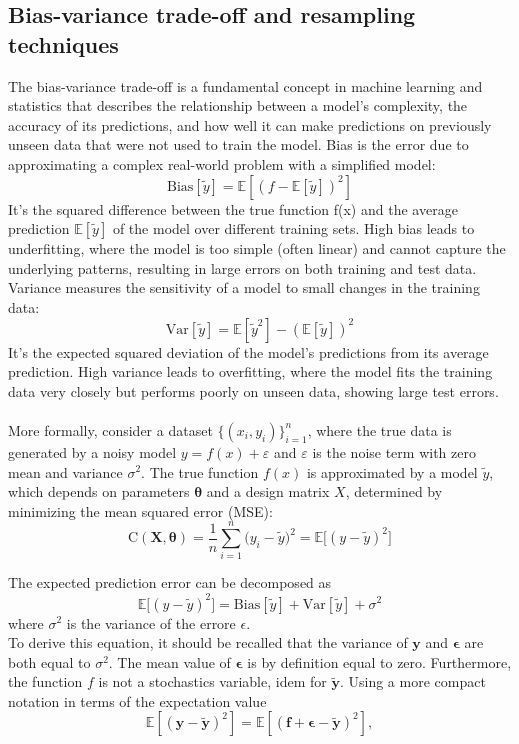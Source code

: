 \documentclass[
 reprint,            %
 amsmath,amssymb,
 aps,
]{revtex4-2}
\begin{document}
\subsection{Bias-variance trade-off and resampling techniques}

The bias-variance trade-off is a fundamental concept in machine learning and statistics that describes the relationship between a model's complexity, the accuracy of its predictions, and how well it can make predictions on previously unseen data that were not used to train the model\cite{hjorthjensen_week38}. 
Bias is the error due to approximating a complex real-world problem with a simplified model: 
$$\mathrm{Bias}[\tilde y]= \mathbb{E}[(f-\mathbb{E}[\tilde y])^2]$$
It's the squared difference between the true function f(x) and the average prediction $\mathbb{E}[\tilde y]$ of the model over different training sets.
High bias leads to underfitting, where the model is too simple (often linear) and cannot capture the underlying patterns, resulting in large errors on both training and test data.
\\Variance measures the sensitivity of a model to small changes in the training data:
$$
\mathrm{Var}[\tilde y] = \mathbb{E}[\tilde y^2] - (\mathbb{E}[\tilde y])^2
$$
It's the expected squared deviation of the model's predictions from its average prediction.
High variance leads to overfitting, where the model fits the training data very closely but performs poorly on unseen data, showing large test errors.\\\\
More formally, consider a dataset $\{(x_i, y_i)\}_{i=1}^n$, where the true data is generated by a noisy model $y = f(x) + \varepsilon$ and $\varepsilon$ is the noise term with zero mean and variance $\sigma^2$. 
The true function $f(x)$ is approximated by a model $\tilde y$, which depends on parameters $\boldsymbol{\theta}$ and a design matrix $X$, determined by minimizing the mean squared error (MSE):
$$
\text{C}(\boldsymbol{X, \theta}) = \frac{1}{n} \sum_{i=1}^n \big( y_i - \tilde y \big)^2= \mathbb{E}\big[(y - \tilde y)^2\big]
$$

The expected prediction error can be decomposed as
$$\mathbb{E}[(y - \tilde y)^2\big] = \mathrm{Bias}[\tilde y] + \mathrm{Var}[\tilde y] + \sigma^2$$
where $\sigma ^2$ is the variance of the errore $\epsilon$.\\
To derive this equation, it should be recalled that the variance of $\boldsymbol{y}$ and $\boldsymbol{\epsilon}$ are both equal to $\sigma^2$.
The mean value of $\boldsymbol{\epsilon}$ is by definition equal to zero.
Furthermore, the function $f$ is not a stochastics variable, idem for $\boldsymbol{\tilde{y}}$.
Using a more compact notation in terms of the expectation value
$$
\mathbb{E}\left[(\boldsymbol{y}-\boldsymbol{\tilde{y}})^2\right]=\mathbb{E}\left[(\boldsymbol{f}+\boldsymbol{\epsilon}-\boldsymbol{\tilde{y}})^2\right],
$$
\end{document}
